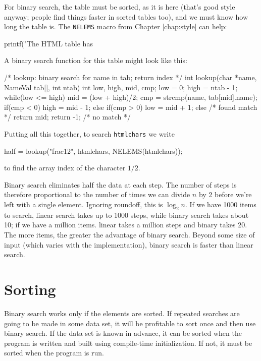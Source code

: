 For binary search, the table must be sorted, as it is here (that's good
style anyway; people find things faster in sorted tables too), and we must
know how long the table is. The \verb'NELEMS' macro from Chapter
\ref{chap:style} can
help:
\begin{wellcode}
    printf("The HTML table has %
\end{wellcode}

A binary search function for this table might look like this:
\begin{wellcode}
    /* lookup: binary search for name in tab; return index */
    int lookup(char *name, NameVal tab[], int ntab)
    {
        int low, high, mid, cmp;
        low = 0;
        high = ntab - 1;
        while(low <= high){
            mid = (low + high)/2;
            cmp = strcmp(name, tab[mid].name);
            if(cmp < 0){
                high = mid - 1;
            }
            else if(cmp > 0){
                low = mid + 1;
            }
            else{   /* found match */
                return mid;
            }
        }
        return -1;  /* no match */
    }
\end{wellcode}
Putting all this together, to search \verb'htmlchars' we write
\begin{wellcode}
    half = lookup("frac12", htmlchars, NELEMS(htmlchars));
\end{wellcode}
to find the array index of the character $1/2$.

Binary search eliminates half the data at each step. The number of steps is
therefore proportional to the number of times we can divide $n$ by 2
before we're left with a single element. Ignoring roundoff, this is $\log_2
n$. If we have 1000 items to search, linear search takes up to 1000 steps,
while binary search takes about 10; if we have a million items. linear
takes a million steps and binary takes 20. The more items, the greater the
advantage of binary search. Beyond some size of input (which varies with
the implementation), binary search is faster than linear search.

\section{Sorting}
Binary search works only if the elements are sorted. If repeated searches
are going to be made in some data set, it will be profitable to sort once
and then use binary search. If the data set is known in advance, it can be
sorted when the program is written and built using compile-time
initialization. If not, it must be sorted when the program is run.

